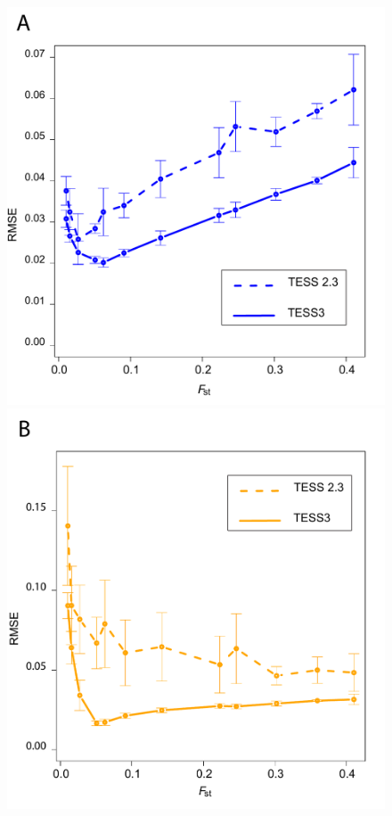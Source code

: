 \begin{figure}[h!]\centering
\begin{minipage}{0.49\textwidth}
\includegraphics[width=\linewidth]{FinalGraphs/rmseG.pdf}
\end{minipage}
\begin {minipage}{0.49\textwidth}
\includegraphics[width=\linewidth]{FinalGraphs/rmseQ.pdf}

\end{minipage}
\end{figure}
